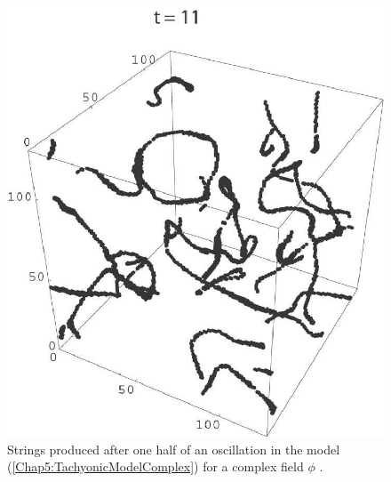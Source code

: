 \documentclass[11pt,a4paper,twoside]{book}
\begin{document}
\begin{figure}
	\centering
	\includegraphics[width=0.6\linewidth, height=0.35\textheight]{Images/Chap5/TachyonicInstability_Fig9}
	\caption{Strings produced after one half of an oscillation in the model (\ref{Chap5:TachyonicModelComplex}) for a complex field $\phi$ \cite{Chap5:TachyonicInstability}.}
	\label{fig:tachyonicinstabilityfig9}
\end{figure}
\end{document}
